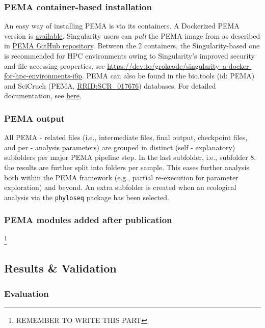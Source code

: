    \subsubsection*{PEMA container-based installation}

   An easy way of installing PEMA is via its containers. 
   A Dockerized PEMA version is \href{ https://hub.docker.com/r/hariszaf/pema}{available}. 
   Singularity users can \textit{pull} the PEMA image from as described in \href{https://github.com/hariszaf/pema}{PEMA GitHub repository}. 
   Between the 2 containers, the Singularity-based one is recommended for HPC environments owing to Singularity's improved security and file accessing properties, 
   see \href{here}{https://dev.to/grokcode/singularity--a-docker-for-hpc-environments-i6p}. 
   PEMA can also be found in the bio.tools (id: PEMA) and SciCruch (PEMA, \href{https://scicrunch.org/resolver/RRID:SCR_017676}{RRID:SCR\_017676}) databases. 
   For detailed documentation, see \href{https://hariszaf.github.io/pema_documentation/}{here}.

   \subsubsection*{PEMA output}

   All PEMA - related files (i.e., intermediate files, final output, checkpoint files, and per - analysis parameters) are grouped in distinct (self - explanatory) subfolders per major PEMA pipeline step. 
   In the last subfolder, i.e., subfolder 8, the results are further split into folders per sample. 
   This eases further analysis both within the PEMA framework (e.g., partial re-execution for parameter exploration) and beyond. 
   An extra subfolder is created when an ecological analysis via the \texttt{phyloseq} package has been selected.


   \subsubsection*{PEMA modules added after publication} \footnote{REMEMBER TO WRITE THIS PART}


   \subsection{Results \& Validation}

   \subsubsection*{Evaluation}

